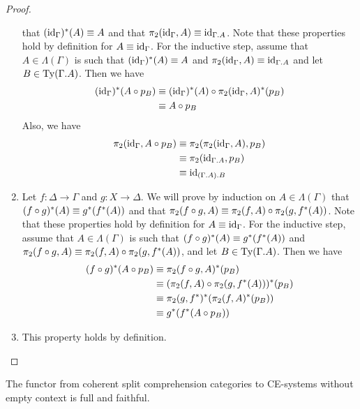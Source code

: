 \begin{proof}
\begin{enumerate}[label=(\alph*)]
that $({\mathrm{id}_{\Gamma}})^\ast(A)\equiv A$ and that $\pi_2(\catid{\Gamma},A)\jdeq \catid{\ctxext{\Gamma}{A}}$.
Note that these properties hold by definition for $A\equiv{\mathrm{id}_{\Gamma}}$. For the
inductive step, assume that $A\in\Lambda(\Gamma)$ is such that
$({\mathrm{id}_{\Gamma}})^\ast(A)\equiv A$ and $\pi_2(\catid{\Gamma},A)\jdeq
\catid{\ctxext{\Gamma}{A}}$ and let $B\in\mathrm{Ty}(\ctxext{\Gamma}{A})$. Then
we have
\begin{align*}
({\mathrm{id}_{\Gamma}})^\ast(A\circ p_B) & \equiv ({\mathrm{id}_{\Gamma}})^\ast(A)\circ \pi_2({\mathrm{id}_{\Gamma}},A)^\ast(p_B) \\
& \equiv A\circ p_B
\end{align*}
Also, we have
\begin{align*}
\pi_2(\catid{\Gamma},A\circ p_B) & \jdeq \pi_2(\pi_2(\catid{\Gamma},A),p_B) \\
& \jdeq \pi_2(\catid{\ctxext{\Gamma}{A}},p_B) \\
& \jdeq \catid{\ctxext{{\Gamma}{A}}{B}}
\end{align*}
\item Let $f:\Delta\to \Gamma$ and $g:X\to \Delta$. We will prove by induction
on $A\in\Lambda(\Gamma)$ that $(f\circ g)^\ast(A)\equiv g^\ast(f^\ast(A))$ and
that $\pi_2(f\circ g,A)\equiv \pi_2(f,A)\circ \pi_2(g,f^\ast(A))$. Note that
these properties hold by definition for $A\equiv{\mathrm{id}_{\Gamma}}$. For the inductive
step, assume that $A\in\Lambda(\Gamma)$ is such that $(f\circ g)^\ast(A)\equiv g^\ast(f^\ast(A))$ and
$\pi_2(f\circ g,A)\equiv \pi_2(f,A)\circ \pi_2(g,f^\ast(A))$, and let
$B\in\mathrm{Ty}(\ctxext{\Gamma}{A})$. Then we have
\begin{align*}
(f\circ g)^\ast(A\circ p_B) & \equiv \pi_2(f\circ g,A)^\ast(p_B) \\
& \equiv (\pi_2(f,A)\circ\pi_2(g,f^\ast(A)))^\ast(p_B) \\
& \equiv \pi_2(g,f^\ast)^\ast(\pi_2(f,A)^\ast(p_B)) \\
& \equiv g^\ast(f^\ast(A\circ p_B))
\end{align*}
\item This property holds by definition.\qedhere
\end{enumerate}
\end{proof}

\begin{conj}
The functor from coherent split comprehension categories to CE-systems without
empty context is full and faithful.
\end{conj}

